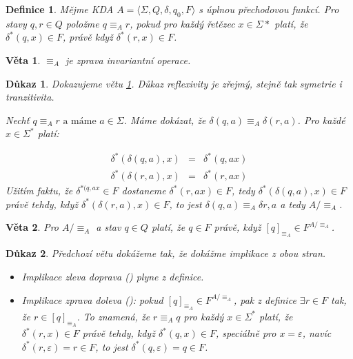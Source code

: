 \documentclass[10pt, a4paper, titlepage]{article}
\theoremstyle{note}
\newtheorem{dukaz}{Důkaz}
\newtheorem{veta}{Věta}
\newtheorem{definice}{Definice}
\begin{document}
\begin{definice}
Mějme KDA $A = \langle \Sigma, Q, \delta, q_{0}, F \rangle$ s úplnou přechodovou funkcí.
Pro stavy $q, r \in Q$ položme $q \equiv_{A} r$, pokud pro každ\'y řetězec $x \in \Sigma{*}$ plat\'i, že $\delta^{*}(q,x) \in F$,
právě když $\delta^{*}(r,x) \in F$.
\end{definice}

\begin{veta}\label{veta-zprava}
$\equiv_{A}$ je zprava invariantní operace.
\end{veta}

\begin{dukaz}
Dokazujeme větu \ref{veta-zprava}. Důkaz reflexivity je zřejm\'y, stejně tak symetrie i tranzitivita.

Nechť $q \equiv_{A} r \text{ a m\'ame } a \in \Sigma$. M\'ame dok\'azat, že $\delta(q,a) \equiv_{A} \delta(r,a)$. Pro každ\'e
$x \in \Sigma^{*}$ plat\'i:

\begin{eqnarray*}
\delta^{*}(\delta(q,a), x) &=& \delta^{*}(q, ax) \\
\delta^{*}(\delta(r,a), x) &=& \delta^{*}(r, ax)
\end{eqnarray*}
Užit\'im faktu, že $\delta^{*(q, ax} \in F$ dostaneme $\delta^{*}(r,ax) \in F$, tedy
$\delta^{*}(\delta(q,a),x) \in F$ pr\'avě tehdy, když $\delta^{*}(\delta(r,a),x) \in F$, to jest
$\delta(q,a) \equiv_{A} \delta{r, a}$ a tedy $A/ \equiv_{A}$.
\end{dukaz}

\begin{veta}\label{veta-4}
Pro $A/ \equiv_{A}$ a stav $q \in Q$ plat\'i, že $q \in F$ pr\'avě, když $[q]_{\equiv_{A}} \in F^{A/ \equiv_{A}}$.
\end{veta}

\begin{dukaz}
Předchoz\'i větu dok\'ažeme tak, že dok\'ažme implikace z obou stran.
\begin{itemize}
\item
Implikace zleva doprava (\uv{$\Rightarrow$}) plyne z definice.

\item
Implikace zprava doleva (\uv{$\Leftarrow$}): pokud $[q]_{\equiv_{A}} \in F^{A/ \equiv_{A}}$, pak z definice
$\exists r \in F$ tak, že $r \in [q]_{\equiv_{A}}$. To znamen\'a, že $r \equiv_{A} q$ pro každ\'y $x \in \Sigma^{*}$ plat\'i, že
$\delta^{*}(r,x) \in F$ pr\'avě tehdy, když $\delta^{*}(q,x) \in F$, speci\'alně pro $x = \varepsilon$, nav\'ic
$\delta^{*}(r, \varepsilon) = r \in F$, to jest $\delta^{*}(q,\varepsilon) = q \in F$.
\end{itemize}
\end{dukaz}
\end{document}
